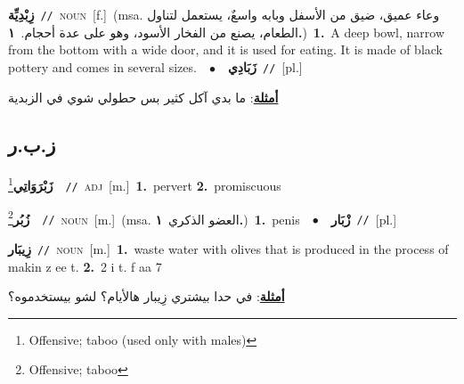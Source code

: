 \documentclass[10pt,a4paper,twoside]{article} %
\begin{document}
\begin{multicols}{2}
{{{{\setlength\topsep{0pt}\textbf{\foreignlanguage{arabic}{زِبْدِيِّة}}\ {\color{gray}\texttt{//}\color{black}}\ \textsc{noun}\ [f.]\ \color{gray}(msa. \foreignlanguage{arabic}{وعاء عميق، ضيق من الأسفل وبابه واسعٌ، يستعمل لتناول الطعام، يصنع من الفخار الأسود، وهو على عدة أحجام.}~\foreignlanguage{arabic}{\textbf{١.}})\color{black}\ \textbf{1.}~A deep bowl, narrow from the bottom with a wide door, and it is used for eating. It is made of black pottery and comes in several sizes.\ \ $\bullet$\ \ \setlength\topsep{0pt}\textbf{\foreignlanguage{arabic}{زَبَادِي}}\ {\color{gray}\texttt{//}\color{black}}\ [pl.]\  \begin{flushright}\color{gray}\foreignlanguage{arabic}{\textbf{\underline{\foreignlanguage{arabic}{أمثلة}}}: ما بدي آكل كثير بس حطولي شوي في الزبدية}\end{flushright}\color{black}} \vspace{2mm}

\vspace{-3mm}
\subsection*{\color{blue}\foreignlanguage{arabic}{ز.ب.ر}\color{blue}{}} 

{\setlength\topsep{0pt}\textbf{\foreignlanguage{arabic}{زَبْرَوَاتِي}}\footnote{Offensive; taboo (used only with males)}\ \ {\color{gray}\texttt{//}\color{black}}\ \textsc{adj}\ [m.]\ \textbf{1.}~pervert  \textbf{2.}~promiscuous\ 

{\setlength\topsep{0pt}\textbf{\foreignlanguage{arabic}{زُبُر}}\footnote{Offensive; taboo}\ \ {\color{gray}\texttt{//}\color{black}}\ \textsc{noun}\ [m.]\ \color{gray}(msa. \foreignlanguage{arabic}{العضو الذكري}~\foreignlanguage{arabic}{\textbf{١.}})\color{black}\ \textbf{1.}~penis\ \ $\bullet$\ \ \setlength\topsep{0pt}\textbf{\foreignlanguage{arabic}{زْبَار}}\ {\color{gray}\texttt{//}\color{black}}\ [pl.]\ 

{\setlength\topsep{0pt}\textbf{\foreignlanguage{arabic}{زِيبَار}}\ {\color{gray}\texttt{//}\color{black}}\ \textsc{noun}\ [m.]\ \textbf{1.}~waste water with olives that is produced in the process of makin z ee t.  \textbf{2.}~2 i t. f aa 7\  \begin{flushright}\color{gray}\foreignlanguage{arabic}{\textbf{\underline{\foreignlanguage{arabic}{أمثلة}}}: في حدا بيشتري زِيبار هالأيام؟ لشو بيستخدموه؟}\end{flushright}\color{black}} \vspace{2mm}

}}}}}
\end{multicols}
\end{document}
